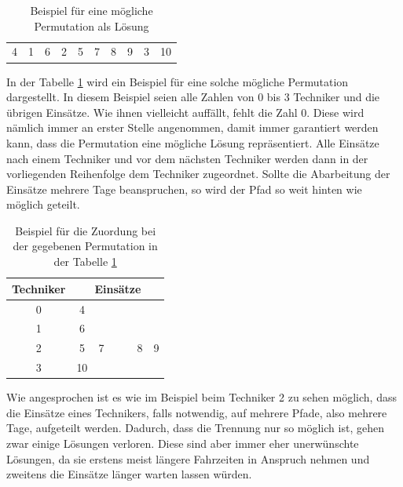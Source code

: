 \documentclass[a4paper,notitlepage,12pt]{report}
\begin{document}
\begin{table}[H]
    \begin{center}
        \begin{tabular}{c|c|c|c|c|c|c|c|c|c}
            4 & 1 & 6 & 2 & 5 & 7 & 8 & 9 & 3 & 10
        \end{tabular}
    \end{center}
    \caption{Beispiel für eine mögliche Permutation als Lösung}
    \label{tab:exaSolPer}
\end{table}

In der Tabelle \ref{tab:exaSolPer} wird ein Beispiel für eine solche mögliche
Permutation dargestellt. In diesem Beispiel seien alle Zahlen von 0 bis 3 Techniker
und die übrigen Einsätze. Wie ihnen vielleicht auffällt, fehlt die Zahl 0. Diese
wird nämlich immer an erster Stelle angenommen, damit immer garantiert werden kann,
dass die Permutation eine mögliche Lösung repräsentiert. Alle Einsätze nach einem
Techniker und vor dem nächsten Techniker werden dann in der vorliegenden Reihenfolge
dem Techniker zugeordnet. Sollte die Abarbeitung der Einsätze mehrere Tage beanspruchen,
so wird der Pfad so weit hinten wie möglich geteilt.

\begin{table}[H]
    \begin{center}
        \begin{tabular}{c|cccccc}
            Techniker & \multicolumn{6}{c}{Einsätze} \\
            \hline
            0 & 4 & & & & & \\
            1 & 6 & & & & & \\
            2 & 5 & 7 & & & 8 & 9 \\
            3 & 10 & & & & &
        \end{tabular}
    \end{center}
    \caption{Beispiel für die Zuordung bei der gegebenen Permutation in der Tabelle \ref{tab:exaSolPer}}
    \label{tab:exaSolMea}
\end{table}

Wie angesprochen ist es wie im Beispiel beim Techniker 2 zu sehen möglich, dass die
Einsätze eines Technikers, falls notwendig, auf mehrere Pfade, also mehrere Tage,
aufgeteilt werden. Dadurch, dass die Trennung nur so möglich ist, gehen zwar einige
Lösungen verloren. Diese sind aber immer eher unerwünschte Lösungen, da sie erstens meist
längere Fahrzeiten in Anspruch nehmen und zweitens die Einsätze länger warten lassen
würden.
\end{document}
